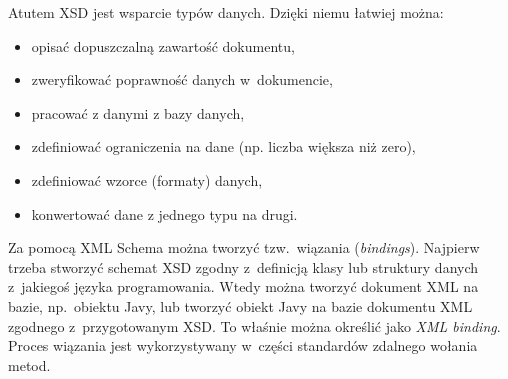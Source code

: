 Atutem XSD jest wsparcie typów danych. Dzięki niemu łatwiej można:
\begin{itemize}
	\item opisać dopuszczalną zawartość dokumentu,
	\item zweryfikować poprawność danych w~dokumencie,
	\item pracować z danymi z bazy danych,
	\item zdefiniować ograniczenia na dane (np. liczba większa niż zero),
	\item zdefiniować wzorce (formaty) danych,
	\item konwertować dane z jednego typu na drugi.
\end{itemize}

Za pomocą XML Schema można tworzyć tzw.\ wiązania (\emph{bindings}). Najpierw trzeba stworzyć schemat XSD zgodny z~definicją klasy lub struktury danych z~jakiegoś języka programowania. Wtedy można tworzyć dokument XML na bazie, np.\ obiektu Javy, lub tworzyć obiekt Javy na bazie dokumentu XML zgodnego z~przygotowanym XSD. To właśnie można określić jako \emph{XML binding}.
Proces wiązania jest wykorzystywany w~części standardów zdalnego wołania metod.

